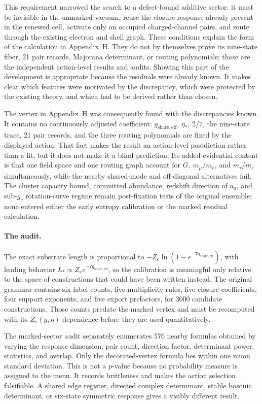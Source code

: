 \documentclass[11pt]{article}
\begin{document}
This requirement narrowed the search to a defect-bound additive sector: it must be invisible in the unmarked vacuum, reuse the closure response already present in the renewed cell, activate only on occupied charged-channel pairs, and route through the existing electron and shell graph. These conditions explain the form of the calculation in Appendix~H. They do not by themselves prove its nine-state fiber, 21 pair records, Majorana determinant, or routing polynomials; those are the independent action-level results and audits. Showing this part of the development is appropriate because the residuals were already known. It makes clear which features were motivated by the discrepancy, which were protected by the existing theory, and which had to be derived rather than chosen.

The vertex in Appendix~H was consequently found with the discrepancies known. It contains no continuously adjusted coefficient: $g_{\mathrm{share,eff}}$, $\eta_*$, $2/7$, the nine-state trace, 21 pair records, and the three routing polynomials are fixed by the displayed action. That fact makes the result an action-level postdiction rather than a fit, but it does not make it a blind prediction. Its added evidential content is that one field space and one routing graph account for $G$, $m_\mu/m_e$, and $m_\tau/m_e$ simultaneously, while the nearby shared-mode and off-diagonal alternatives fail. The cluster capacity bound, committed abundance, redshift direction of $a_0$, and sub-$g_c$ rotation-curve regime remain post-fixation tests of the original ensemble; none entered either the early entropy calibration or the marked residual calculation.

\paragraph{The audit.} The exact substrate length is proportional to $-Z_e\ln(1-e^{-7g_{\mathrm{share,eff}}})$, with leading behavior $L_*\propto Z_ee^{-7g_{\mathrm{share,eff}}}$, so the calibration is meaningful only relative to the space of constructions that could have been written instead. The original grammar contains six label counts, five multiplicity rules, five closure coefficients, four support exponents, and five export prefactors, for 3000 candidate constructions. Those counts predate the marked vertex and must be recomputed with its $Z_e(g,\eta)$ dependence before they are used quantitatively.

The marked-sector audit separately enumerates 576 nearby formulas obtained by varying the response dimension, pair count, direction factor, determinant power, statistics, and overlap. Only the decorated-vertex formula lies within one muon standard deviation. This is not a $p$-value because no probability measure is assigned to the menu. It records brittleness and makes the action selection falsifiable. A shared edge register, directed complex determinant, stable bosonic determinant, or six-state symmetric response gives a visibly different result.
\end{document}
